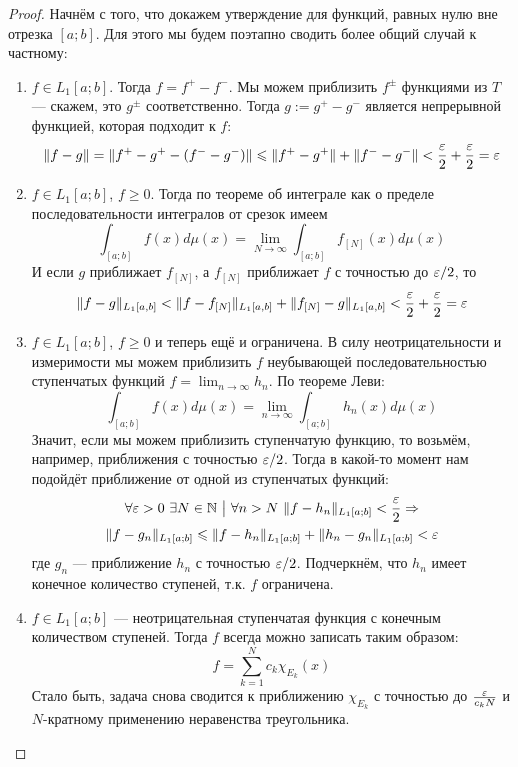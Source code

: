 \begin{proof}
	Начнём с того, что докажем утверждение для функций, равных нулю вне отрезка $[a; b]$. Для этого мы будем поэтапно сводить более общий случай к частному:
	\begin{enumerate}
		\item $f \in L_1[a; b]$. Тогда $f = f^+ - f^-$. Мы можем приблизить $f^{\pm}$ функциями из $T$ --- скажем, это $g^{\pm}$ соответственно. Тогда $g := g^+ - g^-$ является непрерывной функцией, которая подходит к $f$:
		\[
			\|f - g\| = \|f^+ - g^+ - (f^- - g^-)\| \leqslant \|f^+ - g^+\| + \|f^- - g^-\| < \frac{\varepsilon}{2} + \frac{\varepsilon}{2} = \varepsilon
		\]
		\item $f \in L_1[a; b]$, $f \ge 0$. Тогда по теореме об интеграле как о пределе последовательности интегралов от срезок имеем
		\[
			\int_{[a; b]} f(x)d\mu(x) = \lim_{N \to \infty} \int_{[a; b]} f_{[N]}(x)d\mu(x)
		\]
		И если $g$ приближает $f_{[N]}$, а $f_{[N]}$ приближает $f$ с точностью до $\varepsilon / 2$, то
		\[
			\|f - g\|_{L_1[a, b]} < \|f - f_{[N]}\|_{L_1[a, b]} + \|f_{[N]} - g\|_{L_1[a, b]} < \frac{\varepsilon}{2} + \frac{\varepsilon}{2} = \varepsilon
		\]
		\item $f \in L_1[a; b]$, $f \ge 0$ и теперь ещё и ограничена. В силу неотрицательности и измеримости мы можем приблизить $f$ неубывающей последовательностью ступенчатых функций $f = \lim_{n \to \infty} h_n$. По теореме Леви:
		\[
			\int_{[a; b]} f(x)d\mu(x) = \lim_{n \to \infty} \int_{[a; b]} h_n(x)d\mu(x)
		\]
		Значит, если мы можем приблизить ступенчатую функцию, то возьмём, например, приближения с точностью $\varepsilon / 2$. Тогда в какой-то момент нам подойдёт приближение от одной из ступенчатых функций:
		\begin{multline*}
			\forall \varepsilon > 0\ \exists N \in \mathbb{N} \ \big|\  \forall n > N\ \|f - h_n\|_{L_1[a; b]} < \frac{\varepsilon}{2} \Rightarrow
			\\
			\|f - g_n\|_{L_1[a; b]} \leqslant \|f - h_n\|_{L_1[a; b]} + \|h_n - g_n\|_{L_1[a; b]} < \varepsilon
		\end{multline*}
		где $g_n$ --- приближение $h_n$ с точностью $\varepsilon / 2$. Подчеркнём, что $h_n$ имеет конечное количество ступеней, т.к. $f$ ограничена.
		
		\item $f \in L_1[a; b]$ --- неотрицательная ступенчатая функция с конечным количеством ступеней. Тогда $f$ всегда можно записать таким образом:
		\[
			f = \sum_{k = 1}^N c_k \chi_{E_k}(x)
		\]
		Стало быть, задача снова сводится к приближению $\chi_{E_k}$ с точностью до $\frac{\varepsilon}{c_k N}$ и $N$-кратному применению неравенства треугольника.
		

\end{enumerate}
\end{proof}
